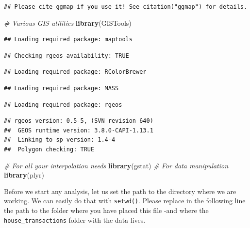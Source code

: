 \documentclass[
]{book}
\newenvironment{Shaded}{\begin{snugshade}}{\end{snugshade}}
\newcommand{\CommentTok}[1]{\textcolor[rgb]{0.56,0.35,0.01}{\textit{#1}}}
\newcommand{\KeywordTok}[1]{\textcolor[rgb]{0.13,0.29,0.53}{\textbf{#1}}}
\newcommand{\NormalTok}[1]{#1}
\begin{document}
\begin{verbatim}
## Please cite ggmap if you use it! See citation("ggmap") for details.
\end{verbatim}

\begin{Shaded}
\begin{Highlighting}[]
\CommentTok{# Various GIS utilities}
\KeywordTok{library}\NormalTok{(GISTools)}
\end{Highlighting}
\end{Shaded}

\begin{verbatim}
## Loading required package: maptools
\end{verbatim}

\begin{verbatim}
## Checking rgeos availability: TRUE
\end{verbatim}

\begin{verbatim}
## Loading required package: RColorBrewer
\end{verbatim}

\begin{verbatim}
## Loading required package: MASS
\end{verbatim}

\begin{verbatim}
## Loading required package: rgeos
\end{verbatim}

\begin{verbatim}
## rgeos version: 0.5-5, (SVN revision 640)
##  GEOS runtime version: 3.8.0-CAPI-1.13.1 
##  Linking to sp version: 1.4-4 
##  Polygon checking: TRUE
\end{verbatim}

\begin{Shaded}
\begin{Highlighting}[]
\CommentTok{# For all your interpolation needs}
\KeywordTok{library}\NormalTok{(gstat)}
\CommentTok{# For data manipulation}
\KeywordTok{library}\NormalTok{(plyr)}
\end{Highlighting}
\end{Shaded}

Before we start any analysis, let us set the path to the directory where we are working. We can easily do that with \texttt{setwd()}. Please replace in the following line the path to the folder where you have placed this file -and where the \texttt{house\_transactions} folder with the data lives.
\end{document}
